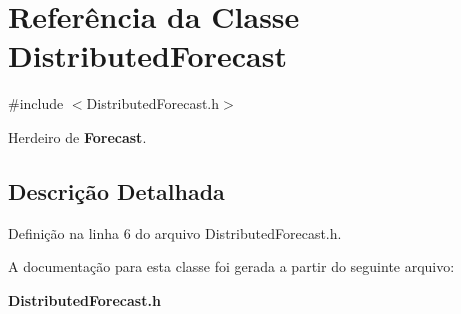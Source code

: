 \section{Referência da Classe Distributed\+Forecast}
\label{class_distributed_forecast}


{\ttfamily \#include $<$Distributed\+Forecast.\+h$>$}



Herdeiro de {\bf Forecast}.



\subsection{Descrição Detalhada}


Definição na linha 6 do arquivo Distributed\+Forecast.\+h.



A documentação para esta classe foi gerada a partir do seguinte arquivo\+:\begin{DoxyCompactItemize}
\item 
{\bf Distributed\+Forecast.\+h}\end{DoxyCompactItemize}
